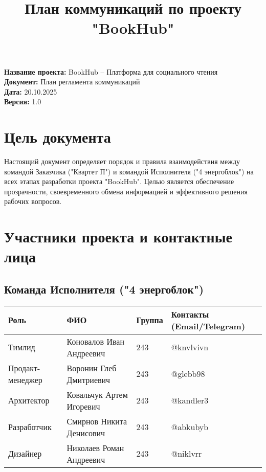 \documentclass[12pt,a4paper]{article}
\title{\textbf{План коммуникаций по проекту "BookHub"}}
\author{}
\date{}
\begin{document}
\maketitle

\vspace{1cm}

\begin{center}
\textbf{Название проекта:} BookHub – Платформа для социального чтения \\
\textbf{Документ:} План регламента коммуникаций \\
\textbf{Дата:} 20.10.2025 \\
\textbf{Версия:} 1.0
\end{center}

\vspace{1cm}

\section{Цель документа}

Настоящий документ определяет порядок и правила взаимодействия между командой Заказчика ("Квартет П") и командой Исполнителя ("4 энергоблок") на всех этапах разработки проекта "BookHub". Целью является обеспечение прозрачности, своевременного обмена информацией и эффективного решения рабочих вопросов.

\section{Участники проекта и контактные лица}

\subsection{Команда Исполнителя ("4 энергоблок")}

\begin{table}[h]
\centering
\begin{tabular}{|p{3cm}|p{4cm}|p{1.5cm}|p{3cm}|}
\hline
\textbf{Роль} & \textbf{ФИО} & \textbf{Группа} & \textbf{Контакты (Email/Telegram)} \\
\hline
Тимлид & Коновалов Иван Андреевич & 243 & @knvlvivn \\
\hline
Продакт-менеджер & Воронин Глеб Дмитриевич & 243 & @glebb98 \\
\hline
Архитектор & Ковальчук Артем Игоревич & 243 & @kandler3 \\
\hline
Разработчик & Смирнов Никита Денисович & 243 & @abkubyb \\
\hline
Дизайнер & Николаев Роман Андреевич & 243 & @niklvrr \\
\hline
\end{tabular}
\end{table}
\end{document}
